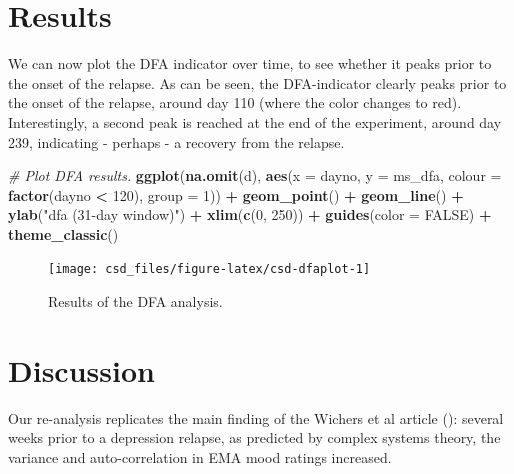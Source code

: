 \documentclass[]{book}
\newenvironment{Shaded}{\begin{snugshade}}{\end{snugshade}}
\newcommand{\KeywordTok}[1]{\textcolor[rgb]{0.13,0.29,0.53}{\textbf{#1}}}
\newcommand{\DataTypeTok}[1]{\textcolor[rgb]{0.13,0.29,0.53}{#1}}
\newcommand{\DecValTok}[1]{\textcolor[rgb]{0.00,0.00,0.81}{#1}}
\newcommand{\StringTok}[1]{\textcolor[rgb]{0.31,0.60,0.02}{#1}}
\newcommand{\CommentTok}[1]{\textcolor[rgb]{0.56,0.35,0.01}{\textit{#1}}}
\newcommand{\OtherTok}[1]{\textcolor[rgb]{0.56,0.35,0.01}{#1}}
\newcommand{\OperatorTok}[1]{\textcolor[rgb]{0.81,0.36,0.00}{\textbf{#1}}}
\newcommand{\NormalTok}[1]{#1}
\begin{document}
\section{Results}\label{results}

We can now plot the DFA indicator over time, to see whether it peaks
prior to the onset of the relapse. As can be seen, the DFA-indicator
clearly peaks prior to the onset of the relapse, around day 110 (where
the color changes to red). Interestingly, a second peak is reached at
the end of the experiment, around day 239, indicating - perhaps - a
recovery from the relapse.

\begin{Shaded}
\begin{Highlighting}[]
\CommentTok{# Plot DFA results.}
\KeywordTok{ggplot}\NormalTok{(}\KeywordTok{na.omit}\NormalTok{(d),}
      \KeywordTok{aes}\NormalTok{(}\DataTypeTok{x =}\NormalTok{ dayno, }\DataTypeTok{y =}\NormalTok{ ms_dfa, }
          \DataTypeTok{colour =} \KeywordTok{factor}\NormalTok{(dayno }\OperatorTok{<}\StringTok{ }\DecValTok{120}\NormalTok{), }
          \DataTypeTok{group =} \DecValTok{1}\NormalTok{)) }\OperatorTok{+}
\StringTok{  }\KeywordTok{geom_point}\NormalTok{() }\OperatorTok{+}
\StringTok{  }\KeywordTok{geom_line}\NormalTok{() }\OperatorTok{+}\StringTok{ }
\StringTok{  }\KeywordTok{ylab}\NormalTok{(}\StringTok{"dfa (31-day window)"}\NormalTok{) }\OperatorTok{+}\StringTok{ }
\StringTok{  }\KeywordTok{xlim}\NormalTok{(}\KeywordTok{c}\NormalTok{(}\DecValTok{0}\NormalTok{, }\DecValTok{250}\NormalTok{)) }\OperatorTok{+}\StringTok{ }
\StringTok{  }\KeywordTok{guides}\NormalTok{(}\DataTypeTok{color =} \OtherTok{FALSE}\NormalTok{) }\OperatorTok{+}\StringTok{ }
\StringTok{  }\KeywordTok{theme_classic}\NormalTok{()}
\end{Highlighting}
\end{Shaded}

\begin{figure}

{\centering \texttt{[image: csd\_files/figure-latex/csd-dfaplot-1]} 

}

\caption{Results of the DFA analysis.}\label{fig:csd-dfaplot}
\end{figure}

\section{Discussion}\label{discussion-2}

Our re-analysis replicates the main finding of the Wichers et al article
(\citep{Wichers2016}): several weeks prior to a depression relapse, as
predicted by complex systems theory, the variance and auto-correlation
in EMA mood ratings increased.
\end{document}
